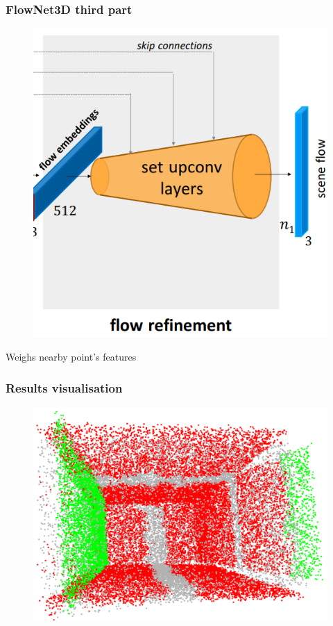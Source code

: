 \documentclass{beamer}
\begin{document}
\begin{frame}[allowframebreaks]
\frametitle{FlowNet3D third part}
\begin{minipage}{\textwidth}
\begin{minipage}{0.45\textwidth}
        \begin{figure}
        \centering        \includegraphics[width=\textwidth,height=0.8\textheight,keepaspectratio]{img/05_FlowNet3D_part3.png}        
        \label{fig:enter-label}
    \end{figure}
    \end{minipage}
    \hfill
    \begin{minipage}{0.45\textwidth}
        Weighs nearby point's features
    \end{minipage} 
\end{minipage}
\end{frame}

\begin{frame}
    \frametitle{Results visualisation}
    \begin{figure}
        \centering
        \includegraphics[scale=0.2]{img/Results_gift.png}
        \label{fig:enter-label}
    \end{figure}
\end{frame}
\end{document}
